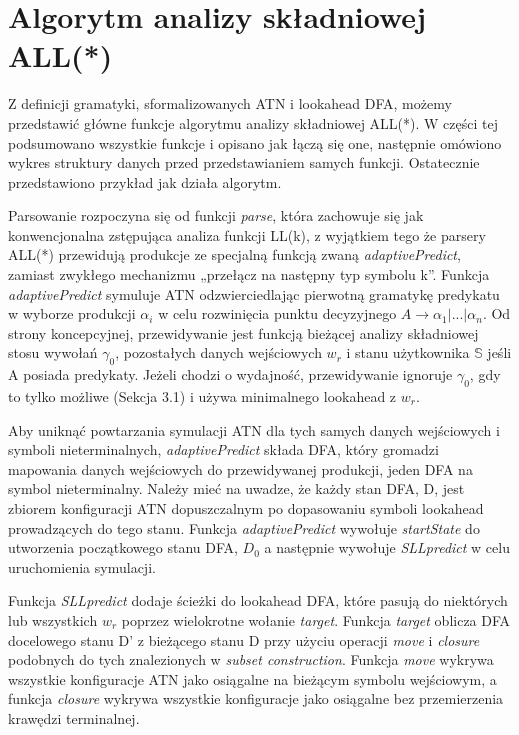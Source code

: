 ﻿\section{Algorytm analizy składniowej ALL(*)}
Z definicji gramatyki, sformalizowanych ATN i lookahead DFA, możemy przedstawić główne funkcje
algorytmu analizy składniowej ALL(*).
W części tej podsumowano wszystkie funkcje i opisano jak łączą się one, następnie omówiono
wykres struktury danych przed przedstawianiem samych funkcji. Ostatecznie przedstawiono
przykład jak działa algorytm.
\par
Parsowanie rozpoczyna się od funkcji \textit{parse}, która zachowuje się jak konwencjonalna
zstępująca analiza funkcji LL(k), z wyjątkiem tego że parsery ALL(*) przewidują
produkcje ze specjalną funkcją zwaną \textit{adaptivePredict},
zamiast zwykłego mechanizmu „przełącz na następny typ symbolu k”.
Funkcja \textit{adaptivePredict} symuluje ATN odzwierciedlając pierwotną gramatykę
predykatu w wyborze produkcji $\alpha_i$ w celu rozwinięcia punktu decyzyjnego
$A \rightarrow \alpha_1 | ... | \alpha_n$.
Od strony koncepcyjnej, przewidywanie jest funkcją bieżącej analizy składniowej stosu wywołań
$\gamma_0$, pozostałych danych wejściowych $w_r$ i stanu użytkownika $\mathbb{S}$ jeśli A posiada predykaty.
Jeżeli chodzi o wydajność, przewidywanie ignoruje $\gamma_0$, gdy to tylko możliwe (Sekcja 3.1)
i używa minimalnego lookahead z $w_r$.
\par
Aby uniknąć powtarzania symulacji ATN dla tych samych danych wejściowych i symboli nieterminalnych,
\textit{adaptivePredict} składa DFA, który gromadzi mapowania danych wejściowych do przewidywanej produkcji,
jeden DFA na symbol nieterminalny.
Należy mieć na uwadze, że każdy stan DFA, D, jest zbiorem konfiguracji ATN dopuszczalnym po dopasowaniu
symboli lookahead prowadzących do tego stanu.
Funkcja \textit{adaptivePredict} wywołuje \textit{startState} do utworzenia początkowego stanu DFA,
\( D_0 \) a następnie wywołuje \textit{SLLpredict} w celu uruchomienia symulacji.
\par
Funkcja \textit{SLLpredict} dodaje ścieżki do lookahead DFA, które pasują do niektórych lub wszystkich
$w_r$ poprzez wielokrotne wołanie \textit{target}. Funkcja \textit{target} oblicza DFA docelowego stanu D'
z bieżącego stanu D przy użyciu operacji \textit{move} i \textit{closure} podobnych do tych
znalezionych w \textit{subset construction}.
Funkcja \textit{move} wykrywa wszystkie konfiguracje ATN jako osiągalne na bieżącym symbolu wejściowym,
a funkcja \textit{closure} wykrywa wszystkie konfiguracje jako osiągalne bez przemierzenia krawędzi terminalnej.
